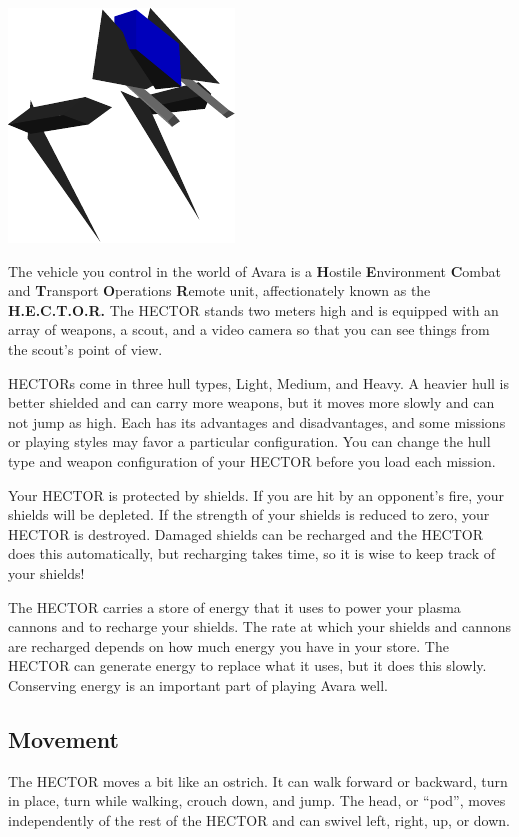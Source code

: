 \documentclass{article}
\begin{document}
\begin{center}
	\includegraphics{img/10.pdf}
\end{center}

The vehicle you control in the world of Avara is a \textbf{H}ostile \textbf{E}nvironment \textbf{C}ombat and \textbf{T}ransport \textbf{O}perations \textbf{R}emote unit, affectionately known as the \textbf{H.E.C.T.O.R.} The HECTOR stands two meters high and is equipped with an array of weapons, a scout, and a video camera so that you can see things from the scout's point of view.

HECTORs come in three hull types, Light, Medium, and Heavy. A heavier hull is better shielded and can carry more weapons, but it moves more slowly and can not jump as high. Each has its advantages and disadvantages, and some missions or playing styles may favor a particular configuration. You can change the hull type and weapon configuration of your HECTOR before you load each mission.

Your HECTOR is protected by shields. If you are hit by an opponent's fire, your shields will be depleted. If the strength of your shields is reduced to zero, your HECTOR is destroyed. Damaged shields can be recharged and the HECTOR does this automatically, but recharging takes time, so it is wise to keep track of your shields!

The HECTOR carries a store of energy that it uses to power your plasma cannons and to recharge your shields. The rate at which your shields and cannons are recharged depends on how much energy you have in your store. The HECTOR can generate energy to replace what it uses, but it does this slowly. Conserving energy is an important part of playing Avara well.

\subsection{Movement}
The HECTOR moves a bit like an ostrich. It can walk forward or backward, turn in place, turn while walking, crouch down, and jump. The head, or ``pod'', moves independently of the rest of the HECTOR and can swivel left, right, up, or down.
\end{document}
